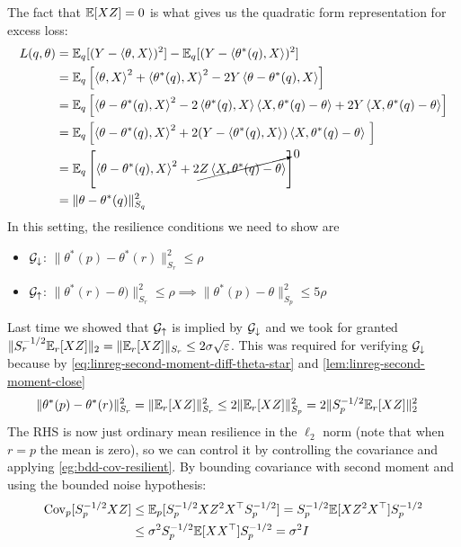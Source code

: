 The fact that $\mathbb{E}[X Z] = 0$ is what gives us the quadratic form representation
for excess loss:
\begin{align}
  L(q, \theta)
  &= \mathbb{E}_q[(Y - \braket{\theta, X})^2] - \mathbb{E}_q[(Y - \braket{\theta^*(q), X})^2] \\
  &= \mathbb{E}_q\left[
    \braket{\theta, X}^2
    + \braket{\theta^*(q), X}^2
    - 2 Y \braket{\theta - \theta^*(q), X}
  \right] \\
  &= \mathbb{E}_q\left[
    \braket{\theta - \theta^*(q), X}^2
    - 2 \braket{\theta^*(q), X} \braket{X, \theta^*(q) - \theta}
    + 2 Y \braket{X, \theta^*(q) - \theta}
  \right] \\
  &= \mathbb{E}_q\left[
    \braket{\theta - \theta^*(q), X}^2
    + 2 (Y - \braket{\theta^*(q), X}) \braket{X, \theta^*(q) - \theta}\
  \right] \\
  &= \mathbb{E}_q\left[
    \braket{\theta - \theta^*(q), X}^2
    + 2 \cancelto{0}{Z \braket{X, \theta^*(q) - \theta}}
  \right] \\
  &= \|\theta - \theta^*(q)\|_{S_q}^2
\end{align}
In this setting, the resilience conditions we need to show are
\begin{itemize}
  \item $\mathcal{G}_\downarrow$: $\|\theta^*(p) - \theta^*(r)\|_{S_r}^2 \leq \rho$
  \item $\mathcal{G}_\uparrow$: $\|\theta^*(r) - \theta)\|_{S_r}^2 \leq \rho \implies \|\theta^*(p) - \theta\|_{S_p}^2 \leq 5 \rho$
\end{itemize}
Last time we showed that $\mathcal{G}_\uparrow$ is implied by
$\mathcal{G}_\downarrow$ and we took for granted $\|S_r^{-1/2} \mathbb{E}_r[X Z]\|_2 = \|\mathbb{E}_r[X Z]\|_{S_r} \leq 2
\sigma \sqrt{\varepsilon}$. This was required for verifying $\mathcal{G}_\downarrow$ because
by \cref{eq:linreg-second-moment-diff-theta-star}
and \cref{lem:linreg-second-moment-close}
\begin{align}
  \|\theta^*(p) - \theta^*(r)\|_{S_r}^2
  &= \| \mathbb{E}_r[X Z]\|_{S_r}^2
  \leq 2 \| \mathbb{E}_r[X Z]\|_{S_p}^2
  = 2 \| S_p^{-1/2} \mathbb{E}_r[X Z]\|_2^2
\end{align}
The RHS is now just ordinary mean resilience in the $\ell_2$ norm
(note that when $r = p$ the mean is zero), so we can
control it by controlling the covariance and applying
\cref{eg:bdd-cov-resilient}.
By bounding covariance with second moment and using the bounded
noise hypothesis:
\begin{align}
  \operatorname{Cov}_p[S_p^{-1/2} X Z]
  &\leq \mathbb{E}_p[S_p^{-1/2} X Z^2 X^\top S_p^{-1/2}]
  = S_p^{-1/2} \mathbb{E}[X Z^2 X^\top] S_p^{-1/2} \\
  &\leq \sigma^2 S_p^{-1/2} \mathbb{E}[X X^\top] S_p^{-1/2}
  = \sigma^2 I
\end{align}

